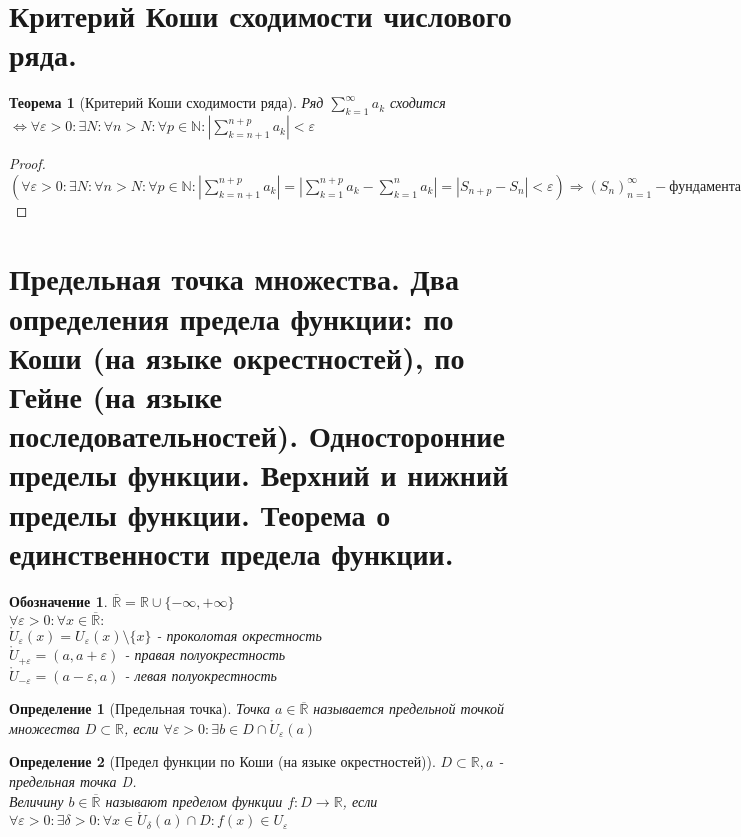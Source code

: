 \documentclass[11pt,a4paper,titlepage]{article}
\newtheorem*{theorem}{Теорема}
\newtheorem*{definition}{Определение}
\newtheorem*{notation}{Обозначение}
\renewcommand{\implies}{\Rightarrow}
\renewcommand{\iff}{\Leftrightarrow}
\renewcommand{\epsilon}{\varepsilon}
\newcommand{\R}{\mathbb{R}}
\newcommand{\N}{\mathbb{N}}
\renewcommand{\U}{\mathring{U}}
\begin{document}
    \section{Критерий Коши сходимости числового ряда.}

    \begin{theorem}[Критерий Коши сходимости ряда]
        Ряд $\sum_{k=1}^\infty a_k$ сходится $\iff \forall \epsilon > 0: \exists N: \forall n > N: \forall p \in \N: |\sum_{k=n+1}^{n+p} a_k| < \epsilon$
    \end{theorem}

    \begin{proof}
        $(\forall \epsilon > 0: \exists N: \forall n > N: \forall p \in \N: |\sum_{k=n+1}^{n+p} a_k| = |\sum_{k=1}^{n+p} a_k - \sum_{k=1}^{n} a_k| = |S_{n+p} - S_n| < \epsilon) \implies (S_n)_{n=1}^\infty - фундаментальная \implies (S_n) - сходится$
    \end{proof}

    \section{Предельная точка множества. Два определения предела функции: по Коши (на языке окрестностей), по Гейне (на языке
    последовательностей). Односторонние пределы функции. Верхний и нижний пределы функции. Теорема о единственности
    предела функции.}

    \begin{notation}
        $\overline{\R} = \R \cup \{-\infty, +\infty\}$\\
        $\forall \epsilon > 0: \forall x \in \overline{\R}:$\\
        $\U_\epsilon(x) = U_\epsilon(x) \setminus \{x\}$ - проколотая окрестность\\
        $\U_{+\epsilon} = (a, a + \epsilon)$ - правая полуокрестность\\
        $\U_{-\epsilon} = (a - \epsilon, a)$ - левая полуокрестность
    \end{notation}

    \begin{definition}[Предельная точка]
        Точка $a \in \overline{\R}$ называется предельной точкой множества $D \subset \R$, если $\forall \epsilon > 0: \exists b \in D \cap \U_\epsilon(a)$
    \end{definition}

    \begin{definition}[Предел функции по Коши (на языке окрестностей)]
        $D \subset \R, a$ - предельная точка D.\\
        Величину $b \in \overline{\R}$ называют пределом функции $f: D \to \R$, если\\
        $\forall \epsilon > 0: \exists \delta > 0: \forall x \in \U_\delta(a) \cap D: f(x) \in U_\epsilon$
    \end{definition}
\end{document}
